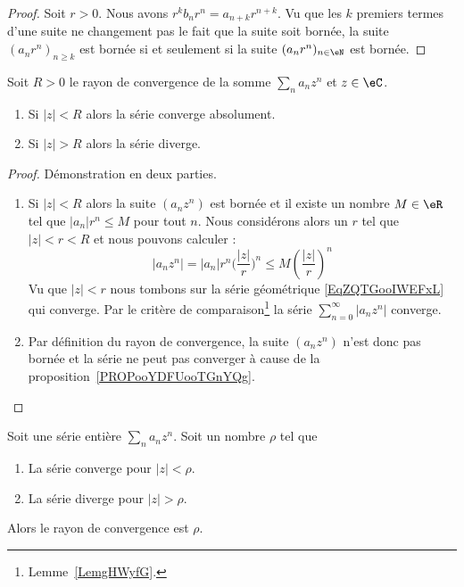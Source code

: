 \begin{proof}
	Soit \( r>0\). Nous avons \( r^kb_nr^n=a_{n+k}r^{n+k}\). Vu que les \( k\) premiers termes d'une suite ne changement pas le fait que la suite soit bornée, la suite \( (a_nr^n)_{n\geq k}\) est bornée si et seulement si la suite \( (a_nr^n)_{n\in \eN}\) est bornée.
\end{proof}

\begin{lemma}   \label{LemmbWnFI}
	Soit \( R>0\) le rayon de convergence de la somme \( \sum_na_nz^n\) et \( z\in \eC\).
	\begin{enumerate}
		\item
		      Si \( | z |<R\) alors la série converge absolument.
		\item
		      Si \( | z |>R\) alors la série diverge.
	\end{enumerate}
\end{lemma}

\begin{proof}
	Démonstration en deux parties.
	\begin{enumerate}
		\item

		      Si \( | z |<R\) alors la suite \( (a_nz^n)\) est bornée et il existe un nombre \( M\in \eR\) tel que \( | a_n |r^n\leq M\) pour tout \( n\). Nous considérons alors un \( r\) tel que \( | z |<r<R\) et nous pouvons calculer :
		      \begin{equation}
			      | a_nz^n |=| a_n |r^n\big( \frac{ | z | }{ r } \big)^n\leq M\left( \frac{ | z | }{ r } \right)^n
		      \end{equation}
		      Vu que \( | z |<r\) nous tombons sur la série géométrique \eqref{EqZQTGooIWEFxL} qui converge. Par le critère de comparaison\footnote{Lemme~\ref{LemgHWyfG}.} la série \( \sum_{n=0}^{\infty}| a_nz^n |\) converge.

		\item
		      Par définition du rayon de convergence, la suite \( (a_nz^n)\) n'est donc pas bornée et la série ne peut pas converger à cause de la proposition~\ref{PROPooYDFUooTGnYQg}.
	\end{enumerate}
\end{proof}

\begin{corollary}       \label{CORooCUDSooTfMvAB}
	Soit une série entière \( \sum_na_nz^n\). Soit un nombre \( \rho\) tel que
	\begin{enumerate}
		\item
		      La série converge pour \( | z |<\rho\).
		\item
		      La série diverge pour \( | z |>\rho\).
	\end{enumerate}
	Alors le rayon de convergence est \( \rho\).
\end{corollary}

